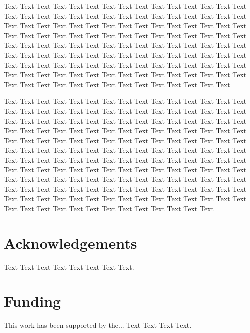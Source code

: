 \documentclass[letter]{bioinfo}
\begin{document}
Text Text Text Text Text Text  Text Text Text Text Text Text Text Text  Text Text Text Text Text Text Text Text  Text Text Text Text Text Text Text Text  Text Text Text Text Text Text Text Text  Text Text Text Text Text Text Text Text  Text Text Text Text Text Text Text Text  Text Text Text Text Text Text Text Text  Text Text Text Text Text Text Text Text  Text Text Text Text Text Text Text Text  Text Text Text Text Text Text Text Text  Text Text Text Text Text Text Text Text  Text Text Text Text Text Text Text Text  Text Text Text Text Text Text Text Text  Text Text Text Text Text Text Text Text  Text Text Text Text Text Text Text Text  Text Text Text Text Text Text Text Text

 Text Text Text Text Text Text Text Text  Text Text Text Text Text Text Text Text  Text Text Text Text Text Text Text Text  Text Text Text Text Text Text Text Text  Text Text Text Text Text Text Text Text  Text Text Text Text Text Text Text Text  Text Text Text Text Text Text Text Text  Text Text Text Text Text Text Text Text  Text Text Text Text Text Text Text Text  Text Text Text Text Text Text Text Text  Text Text Text Text Text Text Text Text  Text Text Text Text Text Text Text Text  Text Text Text Text Text Text Text Text  Text Text Text Text Text Text Text Text  Text Text Text Text Text Text Text Text  Text Text Text Text Text Text Text Text  Text Text Text Text Text Text Text Text  Text Text Text Text Text Text Text Text  Text Text Text Text Text Text Text Text  Text Text Text Text Text Text Text Text  Text Text Text Text Text Text Text Text  Text Text Text Text Text Text Text Text  Text Text 
%

\enlargethispage{12pt}




\section*{Acknowledgements}

Text Text Text Text Text Text  Text Text.  
\vspace*{-12pt}

\section*{Funding}

This work has been supported by the... Text Text  Text Text.\vspace*{-12pt}


%
%
%
%
%
%

\end{document}
